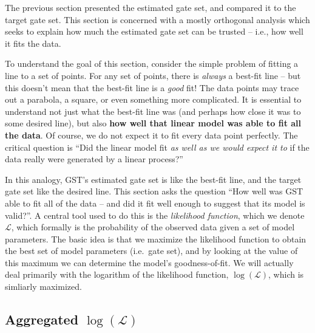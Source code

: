 \documentclass{article}[11pt]
\begin{document}
The previous section presented the estimated gate set, and compared it to the target gate set.  This section is concerned with a mostly orthogonal analysis which seeks to explain how much the estimated gate set can be trusted -- i.e., how well it fits the data.

To understand the goal of this section, consider the simple problem of fitting a line to a set of points.  For any set of points, there is \emph{always} a best-fit line -- but this doesn't mean that the best-fit line is a \emph{good} fit!  The data points may trace out a parabola, a square, or even something more complicated.  It is essential to understand not just what the best-fit line was (and perhaps how close it was to some desired line), but also \textbf{how well that linear model was able to fit all the data}.  Of course, we do not expect it to fit every data point perfectly.  The critical question is ``Did the linear model fit \emph{as well as we would expect it to} if the data really were generated by a linear process?''

In this analogy, GST's estimated gate set is like the best-fit line, and the target gate set like the desired line.  This section asks the question ``How well was GST able to fit all of the data -- and did it fit well enough to suggest that its model is valid?''. A central tool used to do this is the \emph{likelihood function}, which we denote $\mathcal{L}$, which formally is the probability of the observed data given a set of model parameters.  The basic idea is that we maximize the likelihood function to obtain the best set of model parameters (i.e.~gate set), and by looking at the value of this maximum we can determine the model's goodness-of-fit.  We will actually deal primarily with the logarithm of the likelihood function, $\log(\mathcal{L})$, which is simliarly maximized.

\subsection{Aggregated $\log(\mathcal{L})$}
\end{document}
